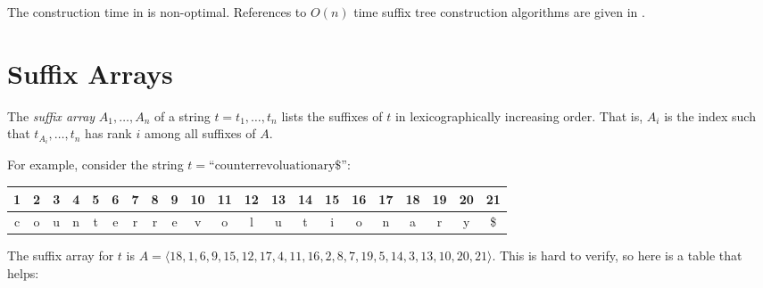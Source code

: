 The construction time in  is non-optimal.
References to $O(n)$ time suffix tree construction algorithms are given
in .


\section{Suffix Arrays}

The \emph{suffix array} $A_1,\ldots,A_n$ of a string $t=t_1,\ldots,t_n$ lists
the suffixes of $t$ in lexicographically increasing order.  That is,
$A_i$ is the index such that $t_{A_{i}},\ldots,t_n$ has rank $i$ among
all suffixes of $A$.  

For example, consider the string $t=\text{``counterrevoluationary\$}$'':
\begin{center}
  \begin{tabular}{|c|c|c|c|c|c|c|c|c|c|c|c|c|c|c|c|c|c|c|c|c|}\hline
     1&2&3&4&5&6&7&8&9&10&11&12&13&14&15&16&17&18&19&20&21\\\hline
     c&o&u&n&t&e&r&r&e&v&o&l&u&t&i&o&n&a&r&y&\$\\\hline
  \end{tabular}
\end{center}
The suffix array for $t$ is
$A=\langle18,1,6,9,15,12,17,4,11,16,2,8,7,19,5,14,3,13,10,20,21\rangle$.  This is hard to verify, so here is a table that helps:

